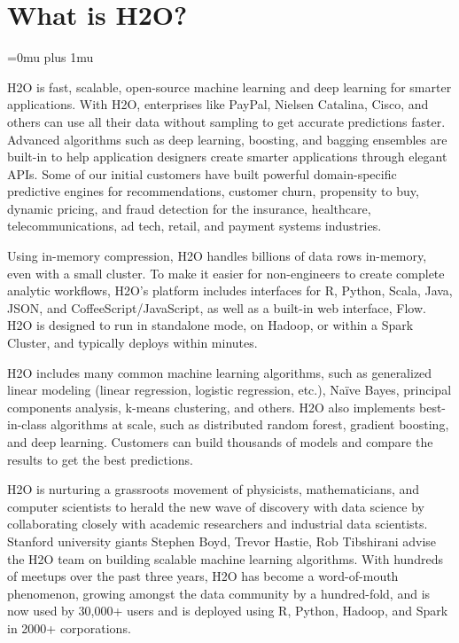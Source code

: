\documentclass{standalone}
\begin{document}
\section{What is H2O?}
\Urlmuskip=0mu plus 1mu\relax %


H2O is fast, scalable, open-source machine learning and deep learning for smarter applications. With H2O, enterprises like PayPal, Nielsen Catalina, Cisco, and others can use all their data without sampling to get accurate predictions faster. Advanced algorithms such as deep learning, boosting, and bagging ensembles are built-in to help application designers create smarter applications through elegant APIs. Some of our initial customers have built powerful domain-specific predictive engines for recommendations, customer churn, propensity to buy, dynamic pricing, and fraud detection for the insurance, healthcare, telecommunications, ad tech, retail, and payment systems industries.

Using in-memory compression, H2O handles billions of data rows in-memory, even with a small cluster. To make it easier for non-engineers to create complete analytic workflows, H2O's platform includes interfaces for R, Python, Scala, Java, JSON, and CoffeeScript/JavaScript, as well as a built-in  web interface, Flow. H2O is designed to run in standalone mode, on Hadoop, or within a Spark Cluster, and typically deploys within minutes.

H2O includes many common machine learning algorithms, such as generalized linear modeling (linear regression, logistic regression, etc.), Na\"{i}ve Bayes, principal components analysis, k-means clustering, and others. H2O also implements best-in-class algorithms at scale, such as distributed random forest, gradient boosting, and deep learning. Customers can build thousands of models and compare the results to get the best predictions.

H2O is nurturing a grassroots movement of physicists, mathematicians, and computer scientists to herald the new wave of discovery with data science by collaborating closely with academic researchers and industrial data scientists. Stanford university giants Stephen Boyd, Trevor Hastie, Rob Tibshirani advise the H2O team on building scalable machine learning algorithms. With hundreds of meetups over the past three years, H2O has become a word-of-mouth phenomenon, growing amongst the data community by a hundred-fold, and is now used by 30,000+ users and is deployed using R, Python, Hadoop, and Spark in 2000+ corporations.
\end{document}
